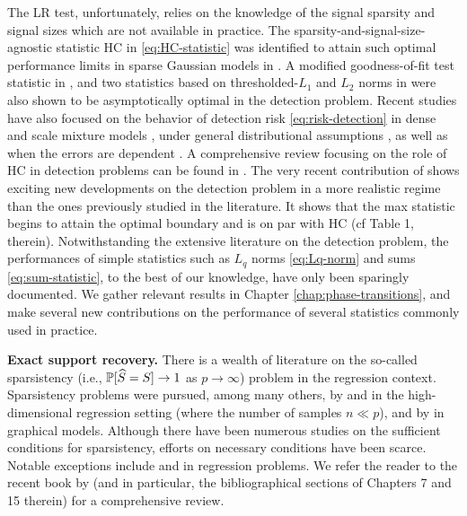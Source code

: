 The \ac{LR} test, unfortunately, relies on the knowledge of the signal sparsity and signal sizes which are 
not available in practice. The sparsity-and-signal-size-agnostic statistic \ac{HC} in \eqref{eq:HC-statistic} was identified 
to attain such optimal performance limits in sparse Gaussian models in \cite{donoho2004higher}. 
A modified goodness-of-fit test statistic in \citet{zhang2002powerful}, and two statistics based on thresholded-$L_1$ and $L_2$ norms in \cite{zhong2013tests} were also shown to be asymptotically optimal in the detection problem.
Recent studies have also focused on the behavior of detection risk \eqref{eq:risk-detection} in dense and scale mixture models \cite{cai2011optimal}, under general distributional assumptions \citep{cai2014optimal, arias2017distribution1}, as well as when the errors are dependent \citep{hall2010innovated}.
A comprehensive review focusing on the role of \ac{HC} in detection problems can be found in \cite{donoho2015special}. The very recent 
contribution of \cite{li2020optimality} shows exciting new developments on the detection problem in a more realistic regime than the ones previously studied 
in the literature.  It shows that the max statistic begins to attain the optimal boundary and is on par with \ac{HC} (cf Table 1, therein). 
Notwithstanding the extensive literature on the detection problem, the performances of simple statistics such as 
$L_q$ norms \eqref{eq:Lq-norm} and sums \eqref{eq:sum-statistic}, to the best of our knowledge, have only been 
sparingly documented.  We gather relevant results in Chapter \ref{chap:phase-transitions}, and make several new 
contributions on the performance of several statistics commonly used in practice.

\medskip

{\bf Exact support recovery.}
There is a wealth of literature on the so-called sparsistency (i.e., $\P[\widehat{S} = S]\to 1$ as $p\to\infty$) problem in the regression context. 
Sparsistency problems were pursued, among many others, by \citet{zhao2006model} and \citet{wasserman2009high} in the high-dimensional regression setting (where the number of samples $n\ll p$), and by \citet*{meinshausen2006high} in graphical models.
Although there have been numerous studies on the sufficient conditions for sparsistency, efforts on necessary conditions have been scarce.
Notable exceptions include \cite{wainwright2009information, wainwright2009sharp} and \cite{comminges2012tight} in regression problems.
We refer the reader to the recent book by \cite{wainwright2019high} (and in particular, the bibliographical sections of Chapters 7 and 15 therein) for a comprehensive review.

